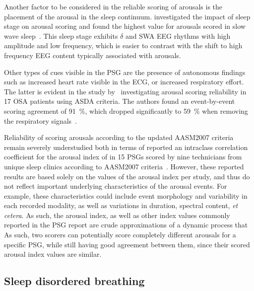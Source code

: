             Another factor to be considered in the reliable scoring of arousals is the placement of the arousal in the sleep continuum.
            \citeauthor{Drinnan1998} investigated the impact of sleep stage on arousal scoring and found the highest \cohen value for arousals scored in slow wave sleep~\cite{Drinnan1998}.
            This sleep stage exhibits $\delta$ and \ac{SWA} \ac{EEG} rhythms with high amplitude and low frequency, which is easier to contrast with the shift to high frequency \ac{EEG} content typically associated with arousals.
            
            Other types of cues visible in the \ac{PSG} are the presence of autonomous findings such as increased heart rate visible in the \ac{ECG}, or increased respiratory effort.
            The latter is evident in the study by~\citeauthor{Thomas2003} investigating arousal scoring reliability in 17 \ac{OSA} patients using \ac{ASDA} criteria. 
            The authors found an event-by-event scoring agreement of \SI{91}{\percent}, which dropped significantly to \SI{59}{\percent} when removing the respiratory signals~\cite{Thomas2003}.
            
            Reliability of scoring arousals according to the updated \ac{AASM}2007 criteria remain severely understudied both in terms of 
            \citeauthor{Magalang2013} reported an intraclass correlation coefficient for the arousal index of  in 15 \acp{PSG} scored by nine technicians from unique sleep clinics according to \ac{AASM}2007 criteria~\cite{Magalang2013}.
            However, these reported results are based solely on the values of the arousal index per study, and thus do not reflect important underlying characteristics of the arousal events.
            For example, these characteristics could include event morphology and variability in each recorded modality, as well as variations in duration, spectral content, \etc \textit{et cetera}.
            As such, the arousal index, as well as other index values commonly reported in the \ac{PSG} report are crude approximations of a dynamic process that 
            As such, two scorers can potentially score completely different arousals for a specific PSG, while still having good agreement between them, since their scored arousal index values are similar.
            
            
        \subsection{Sleep disordered breathing}\label{sec:challenges-sdb}
        
